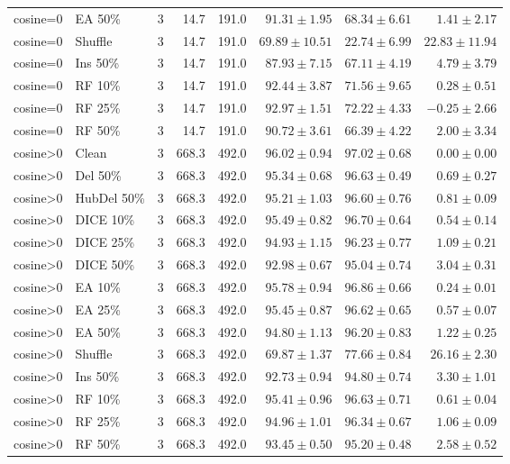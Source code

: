 {\begin{longtable}{llrrrrrr}
cosine=0 & EA 50\% & 3 & 14.7 & 191.0 & $91.31\pm1.95$ & $68.34\pm6.61$ & $1.41\pm2.17$ \\
cosine=0 & Shuffle & 3 & 14.7 & 191.0 & $69.89\pm10.51$ & $22.74\pm6.99$ & $22.83\pm11.94$ \\
cosine=0 & Ins 50\% & 3 & 14.7 & 191.0 & $87.93\pm7.15$ & $67.11\pm4.19$ & $4.79\pm3.79$ \\
cosine=0 & RF 10\% & 3 & 14.7 & 191.0 & $92.44\pm3.87$ & $71.56\pm9.65$ & $0.28\pm0.51$ \\
cosine=0 & RF 25\% & 3 & 14.7 & 191.0 & $92.97\pm1.51$ & $72.22\pm4.33$ & $-0.25\pm2.66$ \\
cosine=0 & RF 50\% & 3 & 14.7 & 191.0 & $90.72\pm3.61$ & $66.39\pm4.22$ & $2.00\pm3.34$ \\
cosine>0 & Clean & 3 & 668.3 & 492.0 & $96.02\pm0.94$ & $97.02\pm0.68$ & $0.00\pm0.00$ \\
cosine>0 & Del 50\% & 3 & 668.3 & 492.0 & $95.34\pm0.68$ & $96.63\pm0.49$ & $0.69\pm0.27$ \\
cosine>0 & HubDel 50\% & 3 & 668.3 & 492.0 & $95.21\pm1.03$ & $96.60\pm0.76$ & $0.81\pm0.09$ \\
cosine>0 & DICE 10\% & 3 & 668.3 & 492.0 & $95.49\pm0.82$ & $96.70\pm0.64$ & $0.54\pm0.14$ \\
cosine>0 & DICE 25\% & 3 & 668.3 & 492.0 & $94.93\pm1.15$ & $96.23\pm0.77$ & $1.09\pm0.21$ \\
cosine>0 & DICE 50\% & 3 & 668.3 & 492.0 & $92.98\pm0.67$ & $95.04\pm0.74$ & $3.04\pm0.31$ \\
cosine>0 & EA 10\% & 3 & 668.3 & 492.0 & $95.78\pm0.94$ & $96.86\pm0.66$ & $0.24\pm0.01$ \\
cosine>0 & EA 25\% & 3 & 668.3 & 492.0 & $95.45\pm0.87$ & $96.62\pm0.65$ & $0.57\pm0.07$ \\
cosine>0 & EA 50\% & 3 & 668.3 & 492.0 & $94.80\pm1.13$ & $96.20\pm0.83$ & $1.22\pm0.25$ \\
cosine>0 & Shuffle & 3 & 668.3 & 492.0 & $69.87\pm1.37$ & $77.66\pm0.84$ & $26.16\pm2.30$ \\
cosine>0 & Ins 50\% & 3 & 668.3 & 492.0 & $92.73\pm0.94$ & $94.80\pm0.74$ & $3.30\pm1.01$ \\
cosine>0 & RF 10\% & 3 & 668.3 & 492.0 & $95.41\pm0.96$ & $96.63\pm0.71$ & $0.61\pm0.04$ \\
cosine>0 & RF 25\% & 3 & 668.3 & 492.0 & $94.96\pm1.01$ & $96.34\pm0.67$ & $1.06\pm0.09$ \\
cosine>0 & RF 50\% & 3 & 668.3 & 492.0 & $93.45\pm0.50$ & $95.20\pm0.48$ & $2.58\pm0.52$ \\

\end{longtable}}
